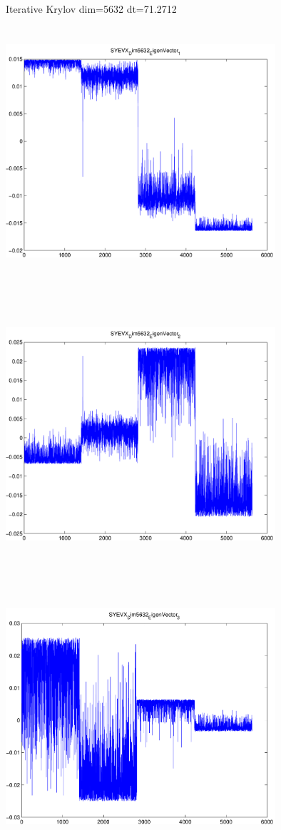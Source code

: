 \documentclass[9pt]{article}
\theoremstyle{plain}
\theoremstyle{definition}
\theoremstyle{remark}
\numberwithin{equation}{section}
\begin{document}
Iterative Krylov dim=5632 dt=71.2712
\includegraphics[width=10.0cm,height=10.0cm]{SYEVX_Dim5632_EigenVector_1.pdf}

\includegraphics[width=10.0cm,height=10.0cm]{SYEVX_Dim5632_EigenVector_2.pdf}

\includegraphics[width=10.0cm,height=10.0cm]{SYEVX_Dim5632_EigenVector_3.pdf}
\end{document}
